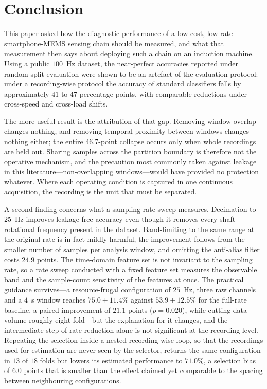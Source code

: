 
\section{Conclusion}
\label{sec:conclusion}

This paper asked how the diagnostic performance of a low-cost, low-rate
smartphone-MEMS sensing chain should be measured, and what that measurement then
says about deploying such a chain on an induction machine. Using a public
$100$~Hz dataset, the near-perfect accuracies reported under random-split
evaluation were shown to be an artefact of the evaluation protocol: under a
recording-wise protocol the accuracy of standard classifiers falls by
approximately $41$ to $47$ percentage points, with comparable reductions under
cross-speed and cross-load shifts.

The more useful result is the attribution of that gap. Removing window overlap
changes nothing, and removing temporal proximity between windows changes nothing
either; the entire $46.7$-point collapse occurs only when whole recordings are
held out. Sharing samples across the partition boundary is therefore not the
operative mechanism, and the precaution most commonly taken against leakage in
this literature---non-overlapping windows---would have provided no protection
whatever. Where each operating condition is captured in one continuous
acquisition, the recording is the unit that must be separated.

A second finding concerns what a sampling-rate sweep measures. Decimation to
$25$~Hz improves leakage-free accuracy even though it removes every shaft
rotational frequency present in the dataset. Band-limiting to the same range at
the original rate is in fact mildly harmful, the improvement follows from the
smaller number of samples per analysis window, and omitting the anti-alias filter
costs $24.9$ points. The time-domain feature set is not invariant to the sampling
rate, so a rate sweep conducted with a fixed feature set measures the observable
band and the sample-count sensitivity of the features at once. The practical
guidance survives---a resource-frugal configuration of $25$~Hz, three raw channels
and a $4$~s window reaches $75.0\pm11.4\%$ against $53.9\pm12.5\%$ for the
full-rate baseline, a paired improvement of $21.1$ points ($p=0.020$), while
cutting data volume roughly eight-fold---but the explanation for it changes, and
the intermediate step of rate reduction alone is not significant at the recording
level. Repeating the selection inside a nested recording-wise loop, so that the
recordings used for estimation are never seen by the selector, returns the same
configuration in $13$ of $18$ folds but lowers its estimated performance to
$71.0\%$, a selection bias of $6.0$ points that is smaller than the effect claimed
yet comparable to the spacing between neighbouring configurations.

